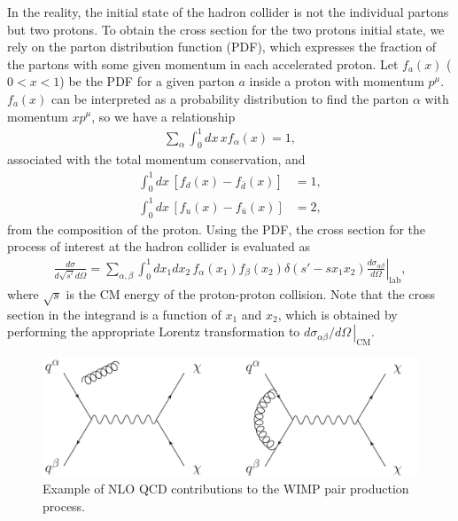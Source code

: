 \documentclass[12pt,twoside,book]{article}
\begin{document}
In the reality, the initial state of the hadron collider is not the individual partons but two protons.
To obtain the cross section for the two protons initial state, we rely on the parton distribution function (PDF), which expresses the fraction of the partons with some given momentum in each accelerated proton.
Let $f_a (x)$ ($0 < x < 1$) be the PDF for a given parton $a$ inside a proton with momentum $p^\mu$.
$f_a (x)$ can be interpreted as a probability distribution to find the parton $\alpha$ with momentum $x p^\mu$, so we have a relationship
\begin{align}
  \sum_\alpha \int_0^1 dx \, x f_\alpha (x) = 1,
\end{align}
associated with the total momentum conservation, and
\begin{align}
  \int_0^1 dx \, \left[ f_d (x) - f_{\bar{d}} (x) \right] &= 1,\\
  \int_0^1 dx \, \left[ f_u (x) - f_{\bar{u}} (x) \right] &= 2,
\end{align}
from the composition of the proton.
Using the PDF, the cross section for the process of interest at the hadron collider is evaluated as
\begin{align}
  \frac{d \sigma}{d \sqrt{s'} d \Omega} =
  \sum_{\alpha, \beta} \int_0^1 dx_1 dx_2 \, f_\alpha (x_1) f_\beta (x_2) \delta \left( s' - s x_1 x_2 \right)
  \left. \frac{d \sigma_{\alpha \beta}}{d \Omega} \right|_{\text{lab}},
\end{align}
where $\sqrt{s}$ is the CM energy of the proton-proton collision.
Note that the cross section in the integrand is a function of $x_1$ and $x_2$, which is obtained by performing the appropriate Lorentz transformation to $\left. d \sigma_{\alpha \beta} / d \Omega\, \right|_{\text{CM}}$.

\begin{figure}[t]
  \centering
  \includegraphics[width=0.8\hsize]{WIMP_production_NLO.pdf}
  \caption{Example of NLO QCD contributions to the WIMP pair production process.}
  \label{fig:WIMP_production_NLO}
\end{figure}
\end{document}
